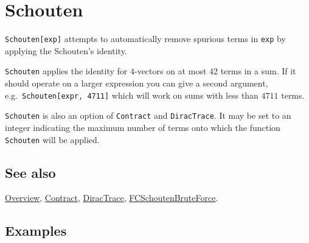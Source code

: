 \documentclass[../FeynCalcManual.tex]{subfiles}
\begin{document}
\hypertarget{schouten}{%
\section{Schouten}\label{schouten}}

\texttt{Schouten[\allowbreak{}exp]} attempts to automatically remove
spurious terms in \texttt{exp} by applying the Schouten's identity.

\texttt{Schouten} applies the identity for \(4\)-vectors on at most
\(42\) terms in a sum. If it should operate on a larger expression you
can give a second argument,
e.g.~\texttt{Schouten[\allowbreak{}expr,\ \allowbreak{}4711]} which will
work on sums with less than \(4711\) terms.

\texttt{Schouten} is also an option of \texttt{Contract} and
\texttt{DiracTrace}. It may be set to an integer indicating the maximum
number of terms onto which the function \texttt{Schouten} will be
applied.

\subsection{See also}

\hyperlink{toc}{Overview}, \hyperlink{contract}{Contract},
\hyperlink{diractrace}{DiracTrace},
\hyperlink{fcschoutenbruteforce}{FCSchoutenBruteForce}.

\subsection{Examples}
\end{document}
